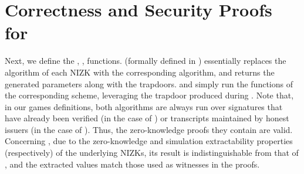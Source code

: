 \section{Correctness and Security Proofs for \CUASGen}
\label{app:uas-proofs}

Next, we define the \SimSetup, \ExtractIssue, \ExtractSign functions. \SimSetup
(formally defined in ) essentially replaces the
\Setup algorithm of each NIZK with the corresponding \NIZKSimSetup algorithm,
and returns the generated parameters along with the
trapdoors. \ExtractIssue and \ExtractSign simply run the \Extract functions
of the corresponding \NIZK scheme, leveraging the trapdoor produced during
\SimSetup. Note that, in our games definitions, both algorithms are always run
over signatures that have already been verified (in the case of \ExtractSign)
or transcripts maintained by honest issuers (in the case of \ExtractIssue).
Thus, the zero-knowledge proofs they contain are valid. Concerning \SimSetup,
due to the zero-knowledge and simulation extractability properties
(respectively) of the underlying NIZKs, its result is indistinguishable from
that of \Setup, and the extracted values match those used as witnesses in the
proofs.

